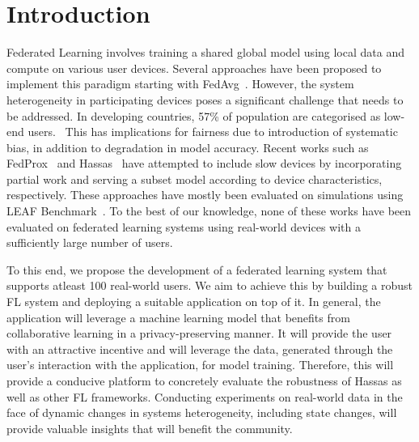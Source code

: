 \section{Introduction}
    Federated Learning involves training a shared global model using local data and compute on various user devices.
    Several approaches have been proposed to implement this paradigm starting with FedAvg~\cite{DBLP:journals/corr/McMahanMRA16}.
    However, the system heterogeneity in participating devices poses a significant challenge that needs to be addressed. In developing countries, 57\% of population are categorised as low-end users.~\cite{10.1145/3446382.3448652}
    This has implications for fairness due to introduction of systematic bias, in addition to degradation in model accuracy.
    Recent works such as FedProx~\cite{DBLP:journals/corr/abs-1812-06127} and Hassas~\cite{DBLP:journals/corr/abs-2110-14205} have attempted to include slow devices by incorporating partial work and serving a subset model according to device characteristics, respectively. 
    These approaches have mostly been evaluated on simulations using LEAF Benchmark~\cite{DBLP:journals/corr/abs-1812-01097}.
    To the best of our knowledge, none of these works have been evaluated on federated learning systems using real-world devices with a sufficiently large number of users. \newline

    To this end, we propose the development of a federated learning system that supports atleast 100 real-world users. We aim to achieve this by building a robust FL system and deploying a suitable application on top of it. In general, the application will leverage a machine learning model that benefits from collaborative learning in a privacy-preserving manner. It will provide the user with an attractive incentive and will leverage the data, generated through the user's interaction with the application, for model training. Therefore, this will provide a conducive platform to concretely evaluate the robustness of Hassas as well as other FL frameworks. Conducting experiments on real-world data in the face of dynamic changes in systems heterogeneity, including state changes, will provide valuable insights that will benefit the community.